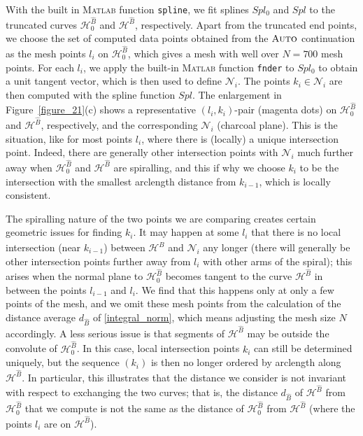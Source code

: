 \documentclass{ws-ijbc}
\begin{document}
With the built in \textsc{Matlab} function \texttt{spline}, we fit splines $Spl_0$ and $Spl$ to the truncated curves $\mathscr{H}_0^{\widehat{B}}$ and $\mathscr{H}^{\widehat{B}}$, respectively.  Apart from the truncated end points, we choose the set of computed data points obtained from the $\textsc{Auto}$ continuation as the mesh points $l_i$ on $\mathscr{H}_0^{\widehat{B}}$, which gives a mesh with well over $N=700$ mesh points. For each $l_i$, we apply the built-in \textsc{Matlab} function \texttt{fnder} to $Spl_0$ to obtain a unit tangent vector, which is then used to define $\mathscr{N}_i$.  The points $k_i \in \mathscr{N}_i$ are then computed with the spline function $Spl$. The enlargement in Figure~\ref{figure_21}(c) shows a representative $(l_i, k_i)$-pair (magenta dots) on $\mathscr{H}_0^{\widehat{B}}$ and $\mathscr{H}^{\widehat{B}}$, respectively, and the corresponding $\mathscr{N}_i$ (charcoal plane). This is the situation, like for most points $l_i$, where there is (locally) a unique intersection point. Indeed, there are generally other intersection points with $\mathscr{N}_i$ much further away when $\mathscr{H}_0^{\widehat{B}}$ and $\mathscr{H}^{\widehat{B}}$  are spiralling, and this if why we choose $k_i$ to be the intersection with the smallest arclength distance from $k_{i-1}$, which is locally consistent. 

The spiralling nature of the two points we are comparing creates certain geometric issues for finding $k_i$. It may happen at some $l_i$ that there is no local intersection (near $k_{i-1}$) between $\mathscr{H}^{\widehat{B}}$ and $\mathscr{N}_i$ any longer (there will generally be other intersection points further away from $l_i$ with other arms of the spiral); this arises when the normal plane to $\mathscr{H}_0^{\widehat{B}}$ becomes tangent to the curve $\mathscr{H}^{\widehat{B}}$ in between the points $l_{i-1}$ and $l_i$. We find that this happens only at only a few points of the mesh, and we omit these mesh points from the calculation of the distance average $d_{\widehat{B}}$ of \eqref{integral_norm}, which means adjusting the mesh size $N$ accordingly. A less serious issue is that segments of $\mathscr{H}^{\widehat{B}}$ may be outside the convolute of $\mathscr{H}_0^{\widehat{B}}$. In this case, local intersection points $k_i$ can still be determined uniquely, but the sequence $(k_i)$ is then no longer ordered by arclength along $\mathscr{H}^{\widehat{B}}$. In particular, this illustrates that the distance we consider is not invariant with respect to exchanging the two curves; that is, the distance $d_{\widehat{B}}$ of $\mathscr{H}^{\widehat{B}}$ from $\mathscr{H}_0^{\widehat{B}}$ that we compute is not the same as the distance of $\mathscr{H}_0^{\widehat{B}}$ from $\mathscr{H}^{\widehat{B}}$ (where the points $l_i$ are on $\mathscr{H}^{\widehat{B}}$). 
\end{document}
